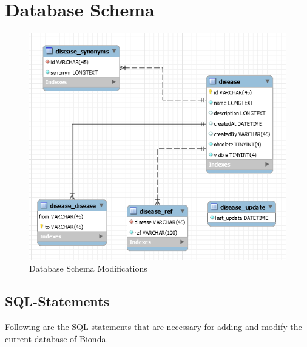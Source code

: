 \chapter{Database Schema}
\label{Anhang_UMLDatenbankschema}
\begin{figure}[H]
\centering
\includegraphics[scale=1]{bilder/db_schema.png}
\caption{Database Schema Modifications}
\end{figure}
\section*{SQL-Statements}
Following are the SQL statements that are necessary for adding and modify the current database of Bionda.\\

